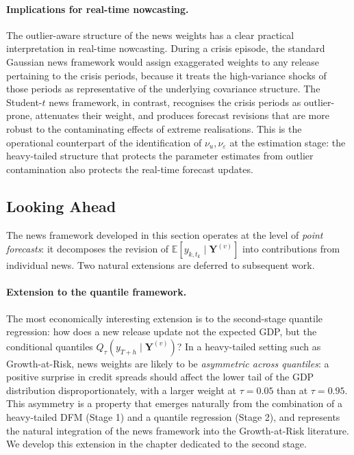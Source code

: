 \documentclass[11pt, a4paper, oneside]{article}
\begin{document}
\paragraph{Implications for real-time nowcasting.}
The outlier-aware structure of the news weights has a clear
practical interpretation in real-time nowcasting. During a crisis
episode, the standard Gaussian news framework would assign
exaggerated weights to any release pertaining to the crisis periods,
because it treats the high-variance shocks of those periods as
representative of the underlying covariance structure. The
Student-$t$ news framework, in contrast, recognises the crisis
periods as outlier-prone, attenuates their weight, and produces
forecast revisions that are more robust to the contaminating effects
of extreme realisations. This is the operational counterpart of the
identification of $\nu_u, \nu_\varepsilon$ at the estimation stage:
the heavy-tailed structure that protects the parameter estimates
from outlier contamination also protects the real-time forecast
updates.


\subsection{Looking Ahead}

The news framework developed in this section operates at the level
of \emph{point forecasts}: it decomposes the revision of
$\mathbb{E}[y_{k, t_k} \mid \mathbf{Y}^{(v)}]$ into contributions from
individual news. Two natural extensions are deferred to subsequent
work.

\paragraph{Extension to the quantile framework.}
The most economically interesting extension is to the second-stage
quantile regression: how does a new release update not the expected
GDP, but the conditional quantiles
$Q_\tau(y_{T+h} \mid \mathbf{Y}^{(v)})$? In a heavy-tailed setting
such as Growth-at-Risk, news weights are likely to be
\emph{asymmetric across quantiles}: a positive surprise in credit
spreads should affect the lower tail of the GDP distribution
disproportionately, with a larger weight at $\tau = 0.05$ than at
$\tau = 0.95$. This asymmetry is a property that emerges naturally
from the combination of a heavy-tailed DFM (Stage 1) and a quantile
regression (Stage 2), and represents the natural integration of the
news framework into the Growth-at-Risk literature. We develop this
extension in the chapter dedicated to the second stage.
\end{document}

